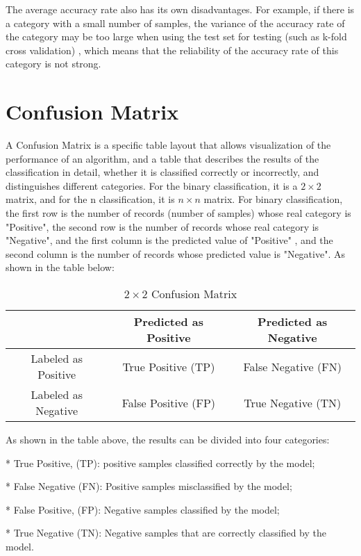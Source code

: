 \documentclass{article}
\begin{document}
The average accuracy rate also has its own disadvantages. For example, if there is a category with a small number of samples, the variance of the accuracy rate of the category may be too large when using the test set for testing (such as k-fold cross validation) , which means that the reliability of the accuracy rate of this category is not strong.

\section{Confusion Matrix}
A Confusion Matrix is a specific table layout that allows visualization of the performance of an algorithm, and a table that describes the results of the classification in detail, whether it is classified correctly or incorrectly, and distinguishes different categories. For the binary classification, it is a $2\times 2$ matrix, and for the n classification, it is $n\times n$ matrix. For binary classification, the first row is the number of records (number of samples) whose real category is "Positive", the second row is the number of records whose real category is "Negative", and the first column is the predicted value of "Positive" , and the second column is the number of records whose predicted value is "Negative". As shown in the table below:

 \begin{table}[h]
    \centering
    \caption{$2\times 2$ Confusion Matrix}
    \begin{tabular}{|c|c|c|}
    \hline
    & Predicted as Positive & Predicted as Negative  \\\hline
    Labeled as Positive & True Positive (TP) & False Negative (FN) \\\hline
    Labeled as Negative & False Positive (FP) & True Negative (TN)\\
    \hline
    \end{tabular}
    \end{table}

As shown in the table above, the results can be divided into four categories:

* True Positive, (TP): positive samples classified correctly by the model;

* False Negative (FN): Positive samples misclassified by the model;

* False Positive, (FP): Negative samples classified by the model;

* True Negative (TN): Negative samples that are correctly classified by the model.
\end{document}
